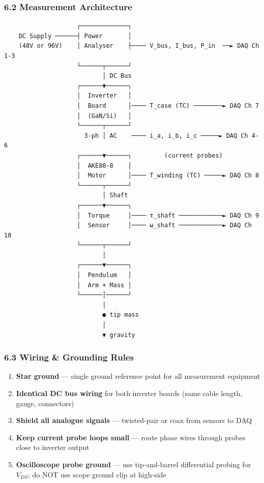 \documentclass[
]{article}
\providecommand{\tightlist}{%
  \setlength{\itemsep}{0pt}\setlength{\parskip}{0pt}}
\begin{document}
\subsubsection{6.2 Measurement
Architecture}\label{measurement-architecture}

\begin{verbatim}
                    ┌─────────────┐
    DC Supply ──────┤ Power       │
    (48V or 96V)    │ Analyser    ├──── V_bus, I_bus, P_in  ──► DAQ Ch 1-3
                    └──────┬──────┘
                           │ DC Bus
                    ┌──────▼──────┐
                    │  Inverter   │
                    │  Board      │──── T_case (TC) ────────► DAQ Ch 7
                    │  (GaN/Si)   │
                    └──────┬──────┘
                      3-ph │ AC    ──── i_a, i_b, i_c ─────► DAQ Ch 4-6
                    ┌──────▼──────┐         (current probes)
                    │  AKE80-8    │
                    │  Motor      │──── T_winding (TC) ─────► DAQ Ch 8
                    └──────┬──────┘
                           │ Shaft
                    ┌──────▼──────┐
                    │  Torque     │──── τ_shaft ────────────► DAQ Ch 9
                    │  Sensor     │──── ω_shaft ────────────► DAQ Ch 10
                    └──────┬──────┘
                           │
                    ┌──────▼──────┐
                    │  Pendulum   │
                    │  Arm + Mass │
                    └──────│──────┘
                           │
                           ● tip mass
                           │
                           ▼ gravity
\end{verbatim}

\subsubsection{6.3 Wiring \& Grounding
Rules}\label{wiring-grounding-rules}

\begin{enumerate}
\def\labelenumi{\arabic{enumi}.}
\tightlist
\item
  \textbf{Star ground} --- single ground reference point for all
  measurement equipment
\item
  \textbf{Identical DC bus wiring} for both inverter boards (same cable
  length, gauge, connectors)
\item
  \textbf{Shield all analogue signals} --- twisted-pair or coax from
  sensors to DAQ
\item
  \textbf{Keep current probe loops small} --- route phase wires through
  probes close to inverter output
\item
  \textbf{Oscilloscope probe ground} --- use tip-and-barrel differential
  probing for \(V_{DS}\); do NOT use scope ground clip at high-side
\end{enumerate}
\end{document}
